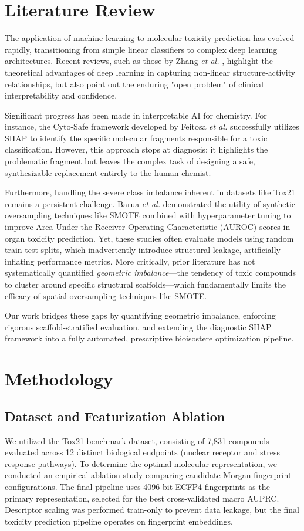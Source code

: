 \documentclass[lettersize,journal]{IEEEtran}
\begin{document}
\section{Literature Review}
The application of machine learning to molecular toxicity prediction has evolved rapidly, transitioning from simple linear classifiers to complex deep learning architectures. Recent reviews, such as those by Zhang \textit{et al.} \cite{ref6}, highlight the theoretical advantages of deep learning in capturing non-linear structure-activity relationships, but also point out the enduring "open problem" of clinical interpretability and confidence. 

Significant progress has been made in interpretable AI for chemistry. For instance, the Cyto-Safe framework developed by Feitosa \textit{et al.} \cite{ref2} successfully utilizes SHAP to identify the specific molecular fragments responsible for a toxic classification. However, this approach stops at diagnosis; it highlights the problematic fragment but leaves the complex task of designing a safe, synthesizable replacement entirely to the human chemist. 

Furthermore, handling the severe class imbalance inherent in datasets like Tox21 remains a persistent challenge. Barua \textit{et al.} \cite{ref1} demonstrated the utility of synthetic oversampling techniques like SMOTE combined with hyperparameter tuning to improve Area Under the Receiver Operating Characteristic (AUROC) scores in organ toxicity prediction. Yet, these studies often evaluate models using random train-test splits, which inadvertently introduce structural leakage, artificially inflating performance metrics. More critically, prior literature has not systematically quantified \textit{geometric imbalance}—the tendency of toxic compounds to cluster around specific structural scaffolds—which fundamentally limits the efficacy of spatial oversampling techniques like SMOTE.

Our work bridges these gaps by quantifying geometric imbalance, enforcing rigorous scaffold-stratified evaluation, and extending the diagnostic SHAP framework into a fully automated, prescriptive bioisostere optimization pipeline.

\section{Methodology}

\subsection{Dataset and Featurization Ablation}
We utilized the Tox21 benchmark dataset, consisting of 7,831 compounds evaluated across 12 distinct biological endpoints (nuclear receptor and stress response pathways). To determine the optimal molecular representation, we conducted an empirical ablation study comparing candidate Morgan fingerprint configurations. The final pipeline uses 4096-bit ECFP4 fingerprints as the primary representation, selected for the best cross-validated macro AUPRC. Descriptor scaling was performed train-only to prevent data leakage, but the final toxicity prediction pipeline operates on fingerprint embeddings.
\end{document}
